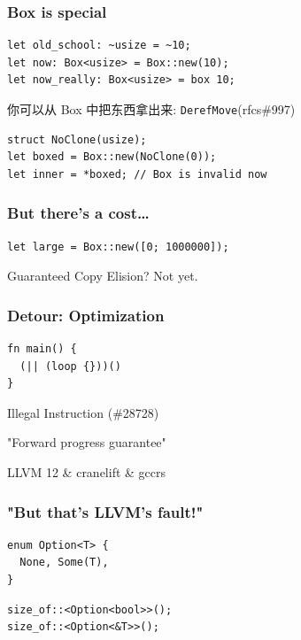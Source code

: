 \documentclass[UTF-8]{ctexbeamer}
\begin{document}
\begin{frame}[fragile]
  \frametitle{Box is special}

  \begin{verbatim}
let old_school: ~usize = ~10;
let now: Box<usize> = Box::new(10);
let now_really: Box<usize> = box 10;
  \end{verbatim}

  \pause
  \vspace{1em}

  你可以从 Box 中把东西拿出来: \texttt{DerefMove}(rfcs\#997)

  \begin{verbatim}
struct NoClone(usize);
let boxed = Box::new(NoClone(0));
let inner = *boxed; // Box is invalid now
  \end{verbatim}
\end{frame}

\begin{frame}[fragile]
  \frametitle{But there's a cost\dots}

  \begin{verbatim}
let large = Box::new([0; 1000000]);
  \end{verbatim}

  \pause
  \vspace{1em}
  Guaranteed Copy Elision? Not yet.
\end{frame}

\begin{frame}[fragile]
  \frametitle{Detour: Optimization}
  \begin{verbatim}
fn main() {
  (|| (loop {}))()
}
  \end{verbatim}
  
  \pause
  \vspace{1em}

  Illegal Instruction (\#28728)

  "Forward progress guarantee"

  \pause

  LLVM 12 \& cranelift \& gccrs
\end{frame}

\begin{frame}[fragile]
  \frametitle{"But that's LLVM's fault!"}

  \begin{verbatim}
enum Option<T> {
  None, Some(T),
}
  \end{verbatim}
  \begin{verbatim}
size_of::<Option<bool>>();
size_of::<Option<&T>>();
  \end{verbatim}
\end{frame}
\end{document}
